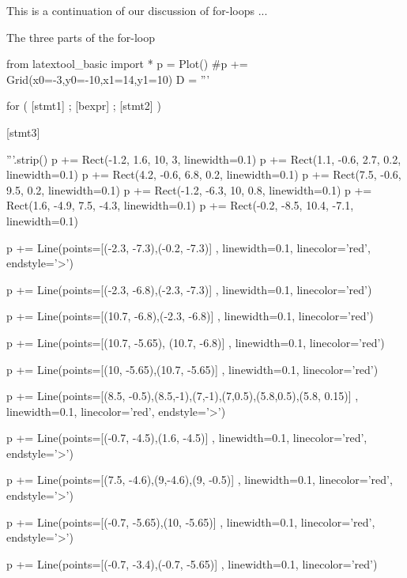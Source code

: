 
This is a continuation of our discussion of for-loops ...

The three parts of the for-loop
\begin{python}
from latextool_basic import *
p = Plot()
#p += Grid(x0=-3,y0=-10,x1=14,y1=10)
D = '''





for ( [stmt1] ;         [bexpr]   ;    [stmt2]  )










            [stmt3]







'''.strip()
p += Rect(-1.2, 1.6, 10, 3, linewidth=0.1)
p += Rect(1.1, -0.6, 2.7, 0.2, linewidth=0.1)
p += Rect(4.2, -0.6, 6.8, 0.2, linewidth=0.1)
p += Rect(7.5, -0.6, 9.5, 0.2, linewidth=0.1)
p += Rect(-1.2, -6.3, 10, 0.8, linewidth=0.1)
p += Rect(1.6, -4.9, 7.5, -4.3, linewidth=0.1)
p += Rect(-0.2, -8.5, 10.4, -7.1, linewidth=0.1)

p += Line(points=[(-2.3, -7.3),(-0.2, -7.3)] , linewidth=0.1, linecolor='red', endstyle='>')

p += Line(points=[(-2.3, -6.8),(-2.3, -7.3)] , linewidth=0.1, linecolor='red')

p += Line(points=[(10.7, -6.8),(-2.3, -6.8)] , linewidth=0.1, linecolor='red')

p += Line(points=[(10.7, -5.65), (10.7, -6.8)] , linewidth=0.1, linecolor='red')

p += Line(points=[(10, -5.65),(10.7, -5.65)] , linewidth=0.1, linecolor='red')

p += Line(points=[(8.5, -0.5),(8.5,-1),(7,-1),(7,0.5),(5.8,0.5),(5.8, 0.15)] , linewidth=0.1, linecolor='red', endstyle='>')

p += Line(points=[(-0.7, -4.5),(1.6, -4.5)] , linewidth=0.1, linecolor='red', endstyle='>')

p += Line(points=[(7.5, -4.6),(9,-4.6),(9, -0.5)] , linewidth=0.1, linecolor='red', endstyle='>')

p += Line(points=[(-0.7, -5.65),(10, -5.65)] , linewidth=0.1, linecolor='red', endstyle='>')

p += Line(points=[(-0.7, -3.4),(-0.7, -5.65)] , linewidth=0.1, linecolor='red')


\end{python}
